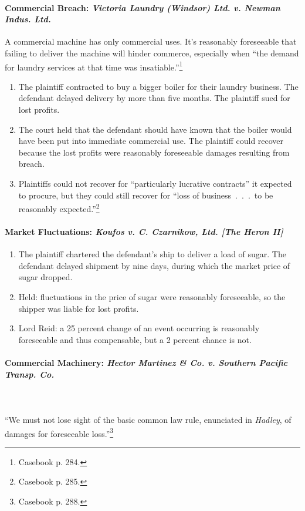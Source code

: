 \paragraph{Commercial Breach: \emph{Victoria Laundry (Windsor) Ltd. v. Newman 
Indus. Ltd.}}

A commercial machine has only commercial uses. It's reasonably foreseeable 
that failing to deliver the machine will hinder commerce, especially when 
``the demand for laundry services at that time was 
insatiable.''\footnote{Casebook p. 284.}

\begin{enumerate}
    \item The plaintiff contracted to buy a bigger boiler for their laundry 
    business. The defendant delayed delivery by more than five months. The 
    plaintiff sued for lost profits.
    \item The court held that the defendant should have known that the boiler 
    would have been put into immediate commercial use. The plaintiff could 
    recover because the lost profits were reasonably foreseeable damages 
    resulting from breach.
    \item Plaintiffs could not recover for ``particularly lucrative 
    contracts'' it expected to procure, but they could still recover for 
    ``loss of business~.~.~.~to be reasonably expected.''\footnote{Casebook p. 
    285.}
\end{enumerate}

\paragraph{Market Fluctuations: \emph{Koufos v. C. Czarnikow, Ltd. [The Heron 
II]}}

\begin{enumerate}
    \item The plaintiff chartered the defendant's ship to deliver a load of 
    sugar. The defendant delayed shipment by nine days, during which the 
    market price of sugar dropped.
    \item Held: fluctuations in the price of sugar were reasonably 
    foreseeable, so the shipper was liable for lost profits.
    \item Lord Reid: a 25 percent change of an event occurring is reasonably 
    foreseeable and thus compensable, but a 2 percent chance is not.
\end{enumerate}

\paragraph{Commercial Machinery: \emph{Hector Martinez \& Co. v. Southern 
Pacific Transp. Co.}}
~\\\\
``We must not lose sight of the basic common law rule, enunciated in 
\emph{Hadley}, of damages for foreseeable loss.''\footnote{Casebook p. 288.}


